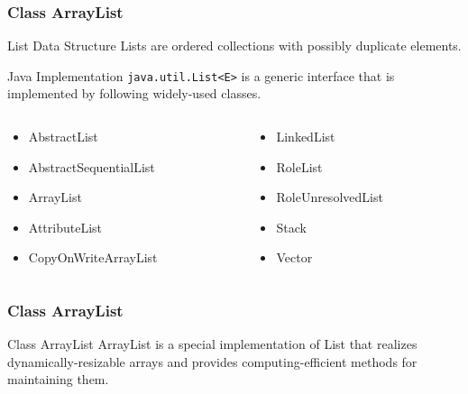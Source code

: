 \documentclass[10pt, compress]{beamer}
\begin{document}
\begin{frame}[fragile]
  \frametitle{Class ArrayList}
  \begin{block}{List Data Structure}
    Lists are ordered collections with possibly duplicate elements.
  \end{block}
  \begin{block}{Java Implementation}
    \texttt{java.util.List<E>} is a generic \alert{interface} that is implemented by following widely-used classes.
    \begin{columns}
      \begin{column}{0.5\textwidth}
        \begin{itemize}
          \item[] AbstractList
          \item[] AbstractSequentialList
          \item[] ArrayList
          \item[] AttributeList
          \item[] CopyOnWriteArrayList
        \end{itemize}
      \end{column}
      \begin{column}{0.5\textwidth}
        \begin{itemize}
          \item[] LinkedList
          \item[] RoleList
          \item[] RoleUnresolvedList
          \item[] Stack
          \item[] Vector
        \end{itemize}
      \end{column}
    \end{columns}
  \end{block}
\end{frame}

\begin{frame}[fragile]
  \frametitle{Class ArrayList}
  \begin{block}{Class ArrayList}
    ArrayList is a special implementation of List that realizes dynamically-resizable arrays and provides computing-efficient methods for maintaining them.
  \end{block}
\end{frame}
\end{document}
